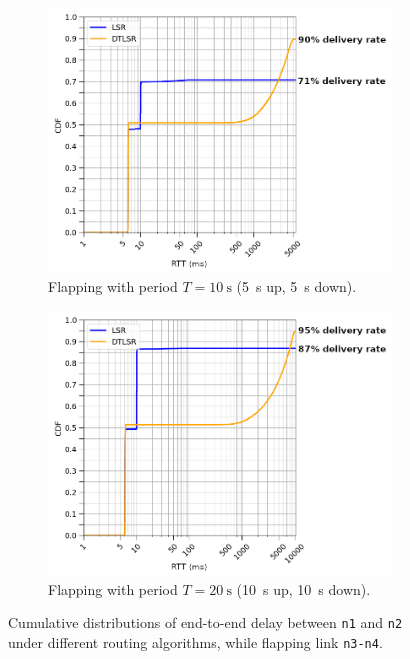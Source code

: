 \documentclass[withindex,glossary,openany]{cam-thesis}
\begin{document}
\begin{figure}
\centering
\begin{subfigure}{0.8\textwidth}
  \centering
  \includegraphics[width=1\linewidth]{delay_box_flap5}
  \caption{Flapping with period $T=\SI{10}{\s}$ (\SI{5}{\s} up, \SI{5}{\s} down).}
  \label{fig:box_5}
\end{subfigure}

\begin{subfigure}{0.8\textwidth}
  \centering
  \includegraphics[width=1\linewidth]{delay_box_flap10}
  \caption{Flapping with period $T=\SI{20}{\s}$ (\SI{10}{\s} up, \SI{10}{\s} down).}
  \label{fig:box_20}
\end{subfigure}
\caption{Cumulative distributions of end-to-end delay between \texttt{n1} and \texttt{n2} under different routing algorithms, while flapping link \texttt{n3-n4}.}
\label{fig:box}
\end{figure}
\end{document}

